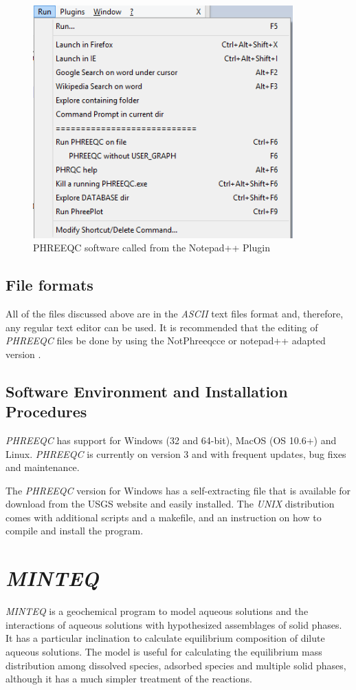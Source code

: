 \begin{figure}[ht!]
\centering
\includegraphics[width=100mm]{figures/notepad++run_menu.png}
\caption{PHREEQC software called from the Notepad++ Plugin}
\label{fig:phreeqc-notepad++3}
\end{figure}

\subsection{File formats}
All of the files discussed above are in the \emph{ASCII} text files format and, therefore, any regular text editor can be used. 
It is recommended that the editing of \emph{PHREEQC} files be done by using the NotPhreeqcce or notepad++ adapted version \cite{NotPhree:11}.

\subsection{Software Environment and Installation Procedures}
\emph{PHREEQC} has support for Windows (32 and 64-bit), MacOS (OS 10.6+) and Linux. \emph{PHREEQC} is currently on version 3 and with frequent updates, bug fixes and maintenance.

The \emph{PHREEQC} version for Windows has a self-extracting file that is available for download from the USGS website and easily installed. The \emph{UNIX} distribution comes with additional scripts and a makefile, and an instruction on how to compile and install the program.

\section{\emph{MINTEQ}}
\emph{MINTEQ} \cite{Felmy:84} is a geochemical program to model aqueous solutions and the interactions of aqueous solutions with hypothesized assemblages of solid phases. It has a particular inclination to calculate equilibrium composition of dilute aqueous solutions. The model is useful for calculating the equilibrium mass distribution among dissolved species, adsorbed species and multiple solid phases, although it has a much simpler treatment of the reactions. 

